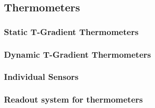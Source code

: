 \subsection{Thermometers}
\label{sec:fddp-slow-cryo-therm}


\subsubsection{Static T-Gradient Thermometers}

\subsubsection{Dynamic T-Gradient Thermometers}

\subsubsection{Individual Sensors}

\subsubsection{Readout system for thermometers}
